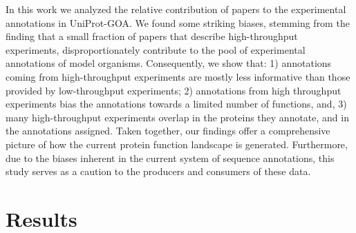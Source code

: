\documentclass[10pt]{article}
\begin{document}
In this work we analyzed the relative contribution of papers to the experimental annotations
in UniProt-GOA.  We found some striking biases, stemming from the finding that a small
fraction of papers that describe high-throughput experiments, disproportionately contribute
to the pool of experimental annotations of model organisms. Consequently, we show that: 1)
annotations coming from high-throughput experiments are mostly less informative than those
provided by low-throughput experiments;  2) annotations from high throughput experiments
bias the annotations towards a limited number of functions, and, 3) many high-throughput
experiments overlap in the proteins they annotate, and in the annotations assigned. Taken
together, our findings offer a comprehensive picture of how the current protein function
landscape is generated. Furthermore, due to the biases inherent in the current system of
sequence annotations, this study serves as a caution to the producers and consumers of these
data.


\section*{Results}
\end{document}
